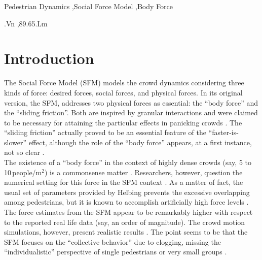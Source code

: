 \documentclass[preprint,12pt]{elsarticle}
\begin{document}
\begin{frontmatter}
\begin{abstract}
\end{abstract}

\begin{keyword}

Pedestrian Dynamics \sep Social Force Model \sep Body Force


.Vn \sep 89.65.Lm

\end{keyword}

\end{frontmatter}


\section{\label{introduction}Introduction}

The Social Force Model (SFM) models the crowd dynamics 
considering three kinds of force: desired forces, social forces, and physical forces.
In its original version, the SFM, addresses two physical forces as essential: 
 the ``body force'' and the ``sliding friction''. Both are 
inspired by granular interactions and were claimed to be necessary  
for attaining the particular effects in panicking crowds \cite{helbing_2000}. 
The ``sliding friction'' actually proved to be an essential feature of the 
``faster-is-slower'' effect, although the role of the ``body force'' appears, 
at a first instance, not so clear \cite{dorso_2005,dorso_2007,dorso_2011}. \\ 

The existence of a ``body force'' in the context of highly dense crowds (say, 5 
to 10$\,$people/m$^2$) is a commonsense matter \cite{henein_2007,fruin_1993}. 
Researchers, however, question the numerical setting for this force in 
the SFM context \cite{lakoba_2005}. As a matter of fact, the usual 
 set of parameters provided by 
Helbing prevents the excessive overlapping among pedestrians, but it is known to 
accomplish artificially high force levels 
\cite{helbing_2000,lakoba_2005,langston_2006,lin_2017}. The force estimates 
from the SFM appear to be remarkably higher with respect to the reported real 
life data (say, an order of magnitude). The crowd motion simulations, however, 
present realistic results \cite{lakoba_2005,langston_2006,dorso_2017}. 
The 
point seems to be that the SFM focuses on the ``collective behavior'' due 
to clogging, missing the ``individualistic'' perspective  of single pedestrians 
or very small groups \cite{helbing_2000,henein_2007,narain_2009}.  \\ 
\end{document}
